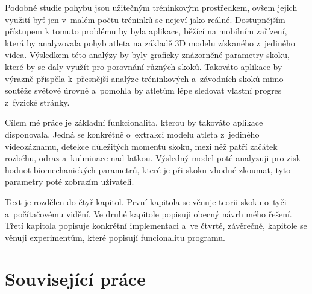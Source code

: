 Podobné studie pohybu jsou užitečným tréninkovým prostředkem, ovšem jejich využití byť jen v~malém počtu tréninků se nejeví jako reálné. Dostupnějším přístupem k tomuto problému by byla aplikace, běžící na mobilním zařízení, která by analyzovala pohyb atleta na základě 3D modelu získaného z~jediného videa. Výsledkem této analýzy by byly graficky znázorněné parametry skoku, které by se daly využít pro porovnání různých skoků. Takováto aplikace by výrazně přispěla k~přesnější analýze tréninkových a~závodních skoků mimo soutěže světové úrovně a~pomohla by atletům lépe sledovat vlastní progres z~fyzické stránky.

Cílem mé práce je základní funkcionalita, kterou by takováto aplikace disponovala. Jedná se konkrétně o~extrakci modelu atleta z~jediného videozáznamu, detekce důležitých momentů skoku, mezi něž patří začátek rozběhu, odraz a~kulminace nad laťkou. Výsledný model poté analyzuji pro zisk hodnot biomechanických parametrů, které je při skoku vhodné zkoumat, tyto parametry poté zobrazím uživateli.

Text je rozdělen do čtyř kapitol. První kapitola se věnuje teorii skoku o~tyči a~počítačovému vidění. Ve druhé kapitole popisuji obecný návrh mého řešení. Třetí kapitola popisuje konkrétní implementaci a~ve čtvrté, závěrečné, kapitole se věnuji experimentům, které popisují funcionalitu programu.



\section*{Související práce}


